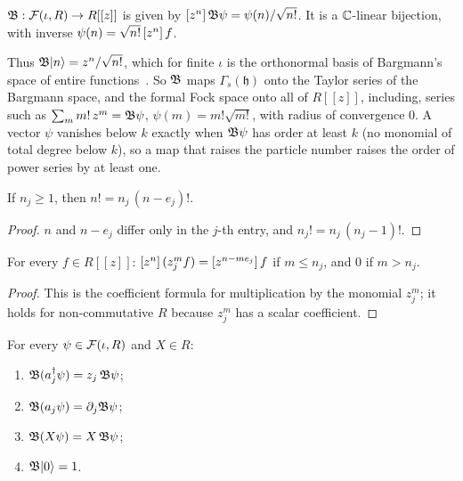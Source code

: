 \begin{definition}\label{def:fock-bargmann}
$\mathfrak B:\mathcal F(\iota,R)\to R[[z]]$ is given by $[z^{n}]\,\mathfrak B\psi=\psi(n)/\sqrt{n!}$.
It is a $\mathbb C$-linear bijection, with inverse $\psi(n)=\sqrt{n!}\,[z^{n}]\,f$.
\end{definition}

Thus $\mathfrak B\lvert n\rangle=z^n/\sqrt{n!}$, which for finite $\iota$ is the orthonormal basis of
Bargmann's space of entire functions~. So $\mathfrak B$ maps $\Gamma_s(\mathfrak h)$
onto the Taylor series of the Bargmann space, and the formal Fock space onto all of $R[[z]]$,
including,  series such as $\sum_mm!\,z^m=\mathfrak B\psi$,
$\psi(m)=m!\sqrt{m!}$, with radius of convergence $0$. A vector $\psi$ vanishes below $k$
exactly when $\mathfrak B\psi$ has order at least $k$ (no monomial of total degree below $k$), so a
map that raises the particle number raises the order of power
series by at least one.

\begin{lemma}\label{lem:fock-factorial}
If $n_j\ge1$, then $n!=n_j\,(n-e_j)!$.
\end{lemma}

\begin{proof}
$n$ and $n-e_j$ differ only in the $j$-th entry, and $n_j!=n_j\,(n_j-1)!$.
\end{proof}

\begin{lemma}\label{lem:fock-shift}
For every $f\in R[[z]]$: $[z^{n}]\,(z_j^mf)=[z^{n-me_j}]\,f$ if $m\le n_j$, and $0$ if
$m>n_j$.
\end{lemma}

\begin{proof}
This is the coefficient formula for multiplication by the monomial $z_j^m$; it holds for
non-commutative $R$ because $z_j^m$ has a scalar coefficient.
\end{proof}

\begin{theorem}[Intertwining]\label{thm:fock-bargmann}
For every $\psi\in\mathcal F(\iota,R)$ and $X\in R$:
\begin{enumerate}
\item[(a)] $\mathfrak B(a_j^\dagger\psi)=z_j\,\mathfrak B\psi$;
\item[(b)] $\mathfrak B(a_j\psi)=\partial_j\mathfrak B\psi$;
\item[(c)] $\mathfrak B(X\psi)=X\,\mathfrak B\psi$;
\item[(d)] $\mathfrak B\lvert 0\rangle=1$.
\end{enumerate}
\end{theorem}

